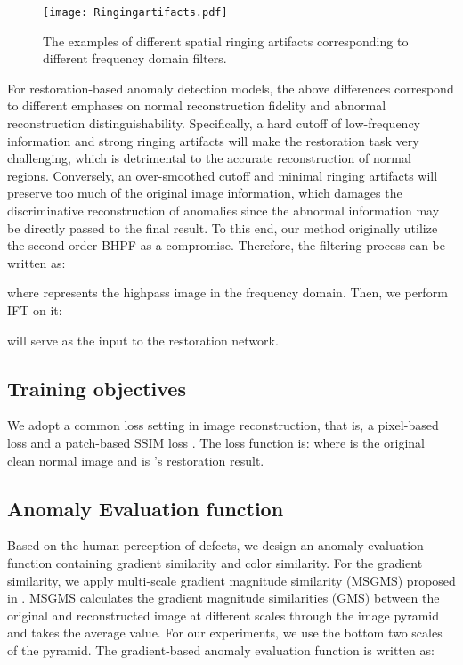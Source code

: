 \documentclass[5p, twocolumn]{elsarticle}[draft]
\begin{document}
\begin{figure}[h]
    \centering
		\texttt{[image: Ringingartifacts.pdf]}
	\caption{The examples of different spatial ringing artifacts corresponding to different frequency domain filters.}
	\label{Ringingartifact}
\end{figure}
For restoration-based anomaly detection models, the above differences correspond to different emphases on normal reconstruction fidelity and abnormal reconstruction distinguishability. Specifically, a hard cutoff of low-frequency information and strong ringing artifacts will make the restoration task very challenging, which is detrimental to the accurate reconstruction of normal regions. Conversely, an over-smoothed cutoff and minimal ringing artifacts will preserve too much of the original image information, which damages the discriminative reconstruction of anomalies since the abnormal information may be directly passed to the final result. To this end, our method originally utilize the second-order BHPF as a compromise. Therefore, the filtering process can be written as: 


where  represents the highpass image in the frequency domain. Then, we perform IFT on it:

 will serve as the input to the restoration network.


 



\subsection{Training objectives}
\label{3.2}
We adopt a common loss setting in image reconstruction, that is, a pixel-based  loss and a patch-based SSIM loss \cite{bergmann2018improving}. The loss function is: 
where  is the original clean normal image and  is 's restoration result.

\subsection{Anomaly Evaluation function}
\label{3.3}
Based on the human perception of defects, we design an anomaly evaluation function containing gradient similarity and color similarity. For the gradient similarity, we apply multi-scale gradient magnitude similarity (MSGMS) proposed in \cite{zavrtanik2021reconstruction}. MSGMS calculates the gradient magnitude similarities (GMS) \cite{xue2013gradient} between the original and reconstructed image at different scales through the image pyramid and takes the average value. For our experiments, we use the bottom two scales of the pyramid. The gradient-based anomaly evaluation function is written as:
\end{document}
